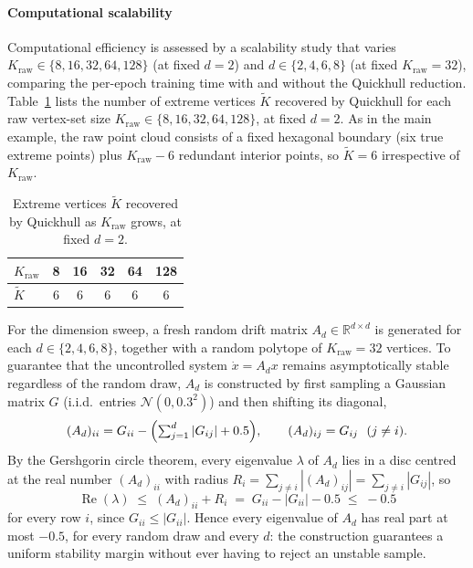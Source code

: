 \documentclass[11pt]{elsarticle}
\theoremstyle{definition}
\theoremstyle{remark}
\numberwithin{equation}{section}
\begin{document}
\paragraph{Computational scalability}
Computational efficiency is assessed by a scalability study that varies
$K_{\mathrm{raw}} \in \{8, 16, 32, 64, 128\}$ (at fixed $d = 2$) and
$d \in \{2, 4, 6, 8\}$ (at fixed $K_{\mathrm{raw}} = 32$), comparing the
per-epoch training time with and without the Quickhull reduction.
Table~\ref{tab:quickhull-K} lists the number of extreme vertices
$\widetilde{K}$ recovered by Quickhull for each raw vertex-set size
$K_{\mathrm{raw}} \in \{8,16,32,64,128\}$, at fixed $d=2$. As in the main
example, the raw point cloud consists of a fixed hexagonal boundary (six true
extreme points) plus $K_{\mathrm{raw}}-6$ redundant interior points, so
$\widetilde{K}=6$ irrespective of $K_{\mathrm{raw}}$.

\begin{table}[htbp]
  \centering
  \begin{tabular}{lccccc}
    \toprule
    $K_{\mathrm{raw}}$ & 8 & 16 & 32 & 64 & 128 \\
    \midrule
    $\widetilde{K}$    & 6 & 6  & 6  & 6  & 6   \\
    \bottomrule
  \end{tabular}
  \caption{Extreme vertices $\widetilde{K}$ recovered by Quickhull as
  $K_{\mathrm{raw}}$ grows, at fixed $d=2$.}
  \label{tab:quickhull-K}
\end{table}

For the dimension sweep, a fresh random drift matrix $A_d \in
\mathbb{R}^{d\times d}$ is generated for each $d \in \{2,4,6,8\}$, together
with a random polytope of $K_{\mathrm{raw}}=32$ vertices. To guarantee that
the uncontrolled system $\dot x = A_d x$ remains asymptotically stable
regardless of the random draw, $A_d$ is constructed by first sampling a
Gaussian matrix $G$ (i.i.d.\ entries $\mathcal{N}(0,0.3^2)$) and then
shifting its diagonal,
\[
  (A_d)_{ii} = G_{ii} - \Bigl(\textstyle\sum_{j=1}^{d}|G_{ij}| + 0.5\Bigr),
  \qquad
  (A_d)_{ij} = G_{ij} \ \ (j \neq i).
\]
By the Gershgorin circle theorem, every eigenvalue $\lambda$ of $A_d$ lies in
a disc centred at the real number $(A_d)_{ii}$ with radius
$R_i = \sum_{j\neq i}|(A_d)_{ij}| = \sum_{j\neq i}|G_{ij}|$, so
\[
  \operatorname{Re}(\lambda) \;\le\; (A_d)_{ii} + R_i
  \;=\; G_{ii} - |G_{ii}| - 0.5
  \;\le\; -0.5
\]
for every row $i$, since $G_{ii}\le |G_{ii}|$. Hence every eigenvalue of
$A_d$ has real part at most $-0.5$, for every random draw and every $d$: the
construction guarantees a uniform stability margin without ever having to
reject an unstable sample.
\end{document}
